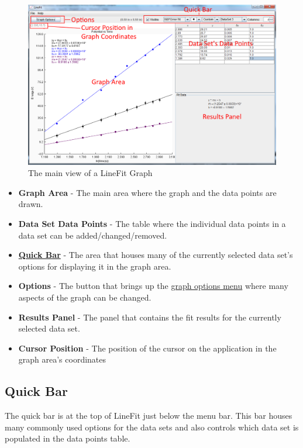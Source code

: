 \documentclass[titlepage,12pt]{article}
\begin{document}
\begin{figure}[ht!]
\centering
\includegraphics[width=15cm]{images/mainLineFitImage.png}
\caption{The main view of a LineFit Graph}
\end{figure}

\begin{itemize}
\item \textbf{Graph Area} - The main area where the graph and the data points are drawn.
\item \textbf{Data Set Data Points} - The table where the individual data points in a data set can be added/changed/removed.
\item \hyperref[sec:quickbar]{\textbf{Quick Bar}} - The area that houses many of the currently selected data set's options for displaying it in the graph area.
\item \textbf{Options} - The button that brings up the \hyperref[sec:options]{graph options menu} where many aspects of the graph can be changed.
\item \textbf{Results Panel} - The panel that contains the fit results for the currently selected data set.
\item \textbf{Cursor Position} - The position of the cursor on the application in the graph area's coordinates
\end{itemize}



\subsection{Quick Bar}
\label{sec:quickbar}

The quick bar is at the top of LineFit just below the menu bar. This bar houses many commonly used options for the data sets and also controls which data set is populated in the data points table.
\end{document}

